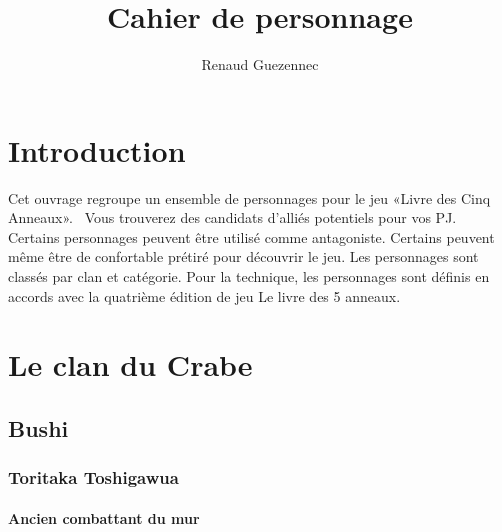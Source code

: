 \documentclass[10pt,a4paper]{book}
\author{Renaud Guezennec}
\title{Cahier de personnage}
\date{}
\begin{document}
\maketitle \clearpage
\tableofcontents \clearpage


\chapter{Introduction}

Cet ouvrage regroupe un ensemble de personnages pour le jeu «Livre des Cinq Anneaux». \
Vous trouverez des candidats d'alliés potentiels pour vos PJ. Certains personnages peuvent être utilisé comme antagoniste.
Certains peuvent même être de confortable prétiré pour découvrir le jeu.
Les personnages sont classés par clan et catégorie.
Pour la technique, les personnages sont définis en accords avec la quatrième édition de jeu Le livre des 5 anneaux.

\chapter{Le clan du Crabe}
\section{Bushi}

\subsection{Toritaka Toshigawua}
\subsubsection*{Ancien combattant du mur}
\end{document}

